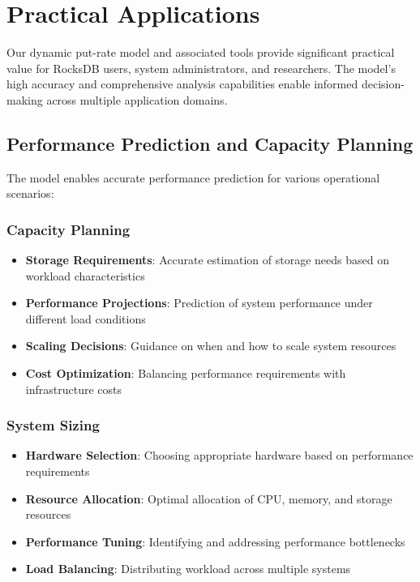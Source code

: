 \documentclass[11pt]{article}
\begin{document}
\section{Practical Applications}

Our dynamic put-rate model and associated tools provide significant practical value for RocksDB users, system administrators, and researchers. The model's high accuracy and comprehensive analysis capabilities enable informed decision-making across multiple application domains.

\subsection{Performance Prediction and Capacity Planning}

The model enables accurate performance prediction for various operational scenarios:

\subsubsection{Capacity Planning}
\begin{itemize}
    \item \textbf{Storage Requirements}: Accurate estimation of storage needs based on workload characteristics
    \item \textbf{Performance Projections}: Prediction of system performance under different load conditions
    \item \textbf{Scaling Decisions}: Guidance on when and how to scale system resources
    \item \textbf{Cost Optimization}: Balancing performance requirements with infrastructure costs
\end{itemize}

\subsubsection{System Sizing}
\begin{itemize}
    \item \textbf{Hardware Selection}: Choosing appropriate hardware based on performance requirements
    \item \textbf{Resource Allocation}: Optimal allocation of CPU, memory, and storage resources
    \item \textbf{Performance Tuning}: Identifying and addressing performance bottlenecks
    \item \textbf{Load Balancing}: Distributing workload across multiple systems
\end{itemize}
\end{document}
